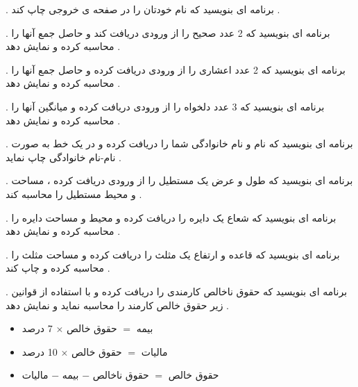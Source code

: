 \documentclass[12pt]{article}
\begin{document}
. برنامه ای بنویسید که نام خودتان را در صفحه ی خروجی چاپ کند .




 . برنامه ای بنویسید که 2 عدد صحیح را از ورودی دریافت کند و حاصل جمع آنها را محاسبه کرده و نمایش دهد .




 . برنامه ای بنویسید که 2 عدد اعشاری را از ورودی دریافت کرده و حاصل جمع آنها را محاسبه کرده و نمایش دهد .





 . برنامه ای بنویسید که 3 عدد دلخواه را از ورودی دریافت کرده و میانگین آنها را محاسبه کرده و نمایش دهد .








 . برنامه ای بنویسید که نام و نام خانوادگی شما را دریافت کرده و در یک خط به صورت نام-نام خانوادگی چاپ نماید .







 . برنامه ای بنویسید که طول و عرض یک مستطیل را از ورودی دریافت کرده ، مساحت و محیط مستطیل را محاسبه کند .






 . برنامه ای بنویسید که شعاع یک دایره را دریافت کرده و محیط و مساحت دایره را محاسبه کرده و نمایش دهد .






 . برنامه ای بنویسید که قاعده و ارتفاع یک مثلث را دریافت کرده و مساحت مثلث را محاسبه کرده و چاپ کند .






 . برنامه ای بنویسید که حقوق ناخالص کارمندی را دریافت کرده و با استفاده از قوانین زیر حقوق خالص کارمند را محاسبه نماید و نمایش دهد .

\begin{itemize}
	\item بیمه $=$ حقوق خالص 
	$\times$ 7 درصد
	\item مالیات $=$ حقوق خالص 
	$\times$ 10 درصد
	\item حقوق خالص $=$ حقوق ناخالص $-$ بیمه $-$ مالیات
\end{itemize}
\end{document}
